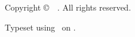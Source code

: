 %
%
%
\thispagestyle{empty}
\vspace*{\fill}

\begin{itshape}
    \small
    \makeatletter
    Copyright \copyright\ \@dtm@ini@year\ \theauthor.
    \makeatother
    All rights reserved.\par
    Typeset using \LaTeXe\ on %
    .
\end{itshape}
